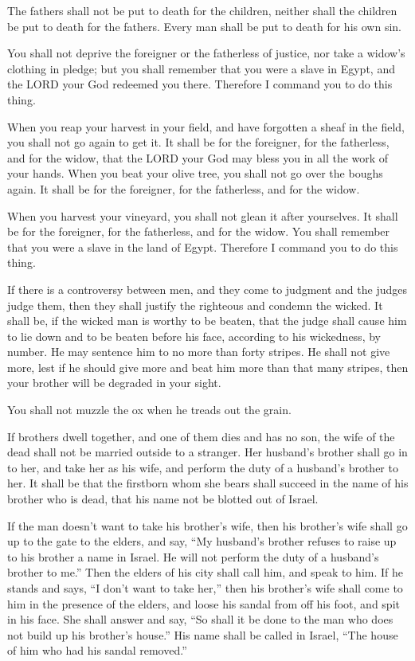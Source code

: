 \myverse{}The fathers shall not be put to death for the children, neither
shall the children be put to death for the fathers. Every man shall be put to death for his own sin.

\myverse{}You shall not deprive the foreigner or the fatherless of justice,
nor take a widow’s clothing in pledge;
\myverse{}but you shall remember that you were a slave in Egypt, and the LORD your
God redeemed you there. Therefore I command you to do this thing.

\myverse{}When you reap your harvest in your field, and have forgotten
a sheaf in the field, you shall not go again to get it. It shall be for the foreigner, for the fatherless,
and for the widow, that the LORD your God may bless you in all the work of your hands.
\myverse{}When you beat your olive tree, you shall not go over the boughs again. It
shall be for the foreigner, for the fatherless, and for the widow.

\myverse{}When you harvest your vineyard, you shall not glean it after
yourselves. It shall be for the foreigner, for the fatherless, and for the widow.
\myverse{}You shall remember that you were a slave in the land of Egypt. Therefore
I command you to do this thing.


\mychapter{} \myverse*{}If there is a controversy between men, and they come to judgment
and the judges judge them, then they shall justify the righteous and condemn the wicked.
\myverse{}It shall be, if the wicked man is worthy to be beaten, that the judge shall
cause him to lie down and to be beaten before his face, according to his wickedness, by number.
\myverse{}He may sentence him to no more than forty stripes. He shall not give more,
lest if he should give more and beat him more than that many stripes, then your brother will be degraded
in your sight.

\myverse{}You shall not muzzle the ox when he treads out the grain.

\myverse{}If brothers dwell together, and one of them dies and has no son,
the wife of the dead shall not be married outside to a stranger. Her husband’s brother shall go in to
her, and take her as his wife, and perform the duty of a husband’s brother to her.
\myverse{}It shall be that the firstborn whom she bears shall succeed in the name of
his brother who is dead, that his name not be blotted out of Israel.

\myverse{}If the man doesn’t want to take his brother’s wife, then his brother’s
wife shall go up to the gate to the elders, and say, “My husband’s brother refuses to raise up to his
brother a name in Israel. He will not perform the duty of a husband’s brother to me.”
\myverse{}Then the elders of his city shall call him, and speak to him. If he stands
and says, “I don’t want to take her,”
\myverse{}then his brother’s wife shall come to him in the presence of the elders, and
loose his sandal from off his foot, and spit in his face. She shall answer and say, “So shall it be done
to the man who does not build up his brother’s house.”
\myverse{}His name shall be called in Israel, “The house of him who had his sandal
removed.”

